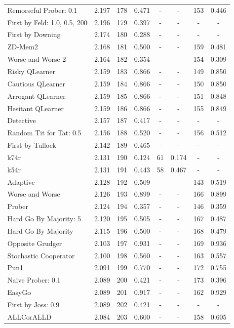 \begin{tabular}{lccccccc}
Remorseful Prober: 0.1 & 2.197 & 178 & 0.471 & - & - & 153 & 0.446 \\
First by Feld: 1.0, 0.5, 200 & 2.196 & 179 & 0.397 & - & - & - & - \\
First by Downing & 2.174 & 180 & 0.288 & - & - & - & - \\
ZD-Mem2 & 2.168 & 181 & 0.500 & - & - & 159 & 0.481 \\
Worse and Worse 2 & 2.164 & 182 & 0.354 & - & - & 154 & 0.309 \\
Risky QLearner & 2.159 & 183 & 0.866 & - & - & 149 & 0.850 \\
Cautious QLearner & 2.159 & 184 & 0.866 & - & - & 150 & 0.850 \\
Arrogant QLearner & 2.159 & 185 & 0.866 & - & - & 151 & 0.848 \\
Hesitant QLearner & 2.159 & 186 & 0.866 & - & - & 155 & 0.849 \\
Detective & 2.157 & 187 & 0.417 & - & - & - & - \\
Random Tit for Tat: 0.5 & 2.156 & 188 & 0.520 & - & - & 156 & 0.512 \\
First by Tullock & 2.142 & 189 & 0.465 & - & - & - & - \\
k74r & 2.131 & 190 & 0.124 & 61 & 0.174 & - & - \\
k54r & 2.131 & 191 & 0.443 & 58 & 0.467 & - & - \\
Adaptive & 2.128 & 192 & 0.509 & - & - & 143 & 0.519 \\
Worse and Worse & 2.126 & 193 & 0.899 & - & - & 166 & 0.899 \\
Prober & 2.124 & 194 & 0.357 & - & - & 146 & 0.359 \\
Hard Go By Majority: 5 & 2.120 & 195 & 0.505 & - & - & 167 & 0.487 \\
Hard Go By Majority & 2.115 & 196 & 0.500 & - & - & 168 & 0.479 \\
Opposite Grudger & 2.103 & 197 & 0.931 & - & - & 169 & 0.936 \\
Stochastic Cooperator & 2.100 & 198 & 0.560 & - & - & 163 & 0.557 \\
Pun1 & 2.091 & 199 & 0.770 & - & - & 172 & 0.755 \\
Naive Prober: 0.1 & 2.089 & 200 & 0.421 & - & - & 173 & 0.396 \\
EasyGo & 2.089 & 201 & 0.917 & - & - & 162 & 0.929 \\
First by Joss: 0.9 & 2.089 & 202 & 0.421 & - & - & - & - \\
ALLCorALLD & 2.084 & 203 & 0.600 & - & - & 158 & 0.605 \\

\end{tabular}
